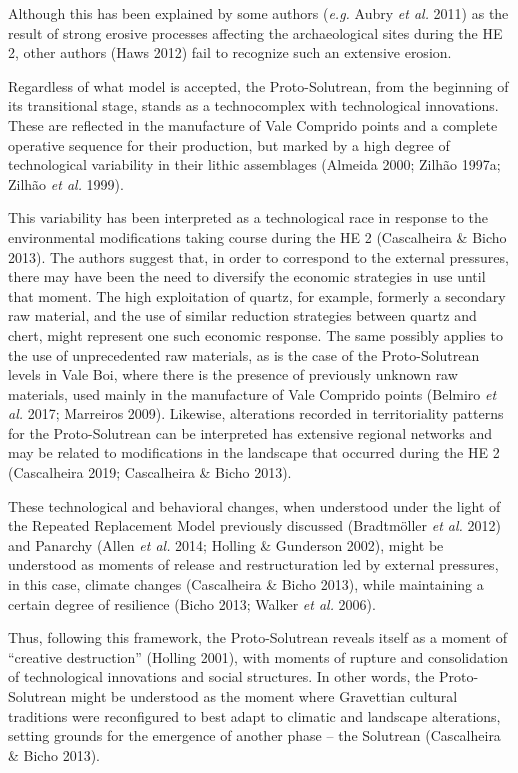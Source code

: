 \documentclass[12pt,twoside]{reedthesis}
\begin{document}
Although this has been explained by some authors (\emph{e.g.} Aubry \emph{et al.} 2011) as the result of strong erosive processes affecting the archaeological sites during the HE 2, other authors (Haws 2012) fail to recognize such an extensive erosion.

Regardless of what model is accepted, the Proto-Solutrean, from the beginning of its transitional stage, stands as a technocomplex with technological innovations. These are reflected in the manufacture of Vale Comprido points and a complete operative sequence for their production, but marked by a high degree of technological variability in their lithic assemblages (Almeida 2000; Zilhão 1997a; Zilhão \emph{et al.} 1999).

This variability has been interpreted as a technological race in response to the environmental modifications taking course during the HE 2 (Cascalheira \& Bicho 2013). The authors suggest that, in order to correspond to the external pressures, there may have been the need to diversify the economic strategies in use until that moment. The high exploitation of quartz, for example, formerly a secondary raw material, and the use of similar reduction strategies between quartz and chert, might represent one such economic response. The same possibly applies to the use of unprecedented raw materials, as is the case of the Proto-Solutrean levels in Vale Boi, where there is the presence of previously unknown raw materials, used mainly in the manufacture of Vale Comprido points (Belmiro \emph{et al.} 2017; Marreiros 2009). Likewise, alterations recorded in territoriality patterns for the Proto-Solutrean can be interpreted has extensive regional networks and may be related to modifications in the landscape that occurred during the HE 2 (Cascalheira 2019; Cascalheira \& Bicho 2013).

These technological and behavioral changes, when understood under the light of the Repeated Replacement Model previously discussed (Bradtmöller \emph{et al.} 2012) and Panarchy (Allen \emph{et al.} 2014; Holling \& Gunderson 2002), might be understood as moments of release and restructuration led by external pressures, in this case, climate changes (Cascalheira \& Bicho 2013), while maintaining a certain degree of resilience (Bicho 2013; Walker \emph{et al.} 2006).

Thus, following this framework, the Proto-Solutrean reveals itself as a moment of ``creative destruction'' (Holling 2001), with moments of rupture and consolidation of technological innovations and social structures. In other words, the Proto-Solutrean might be understood as the moment where Gravettian cultural traditions were reconfigured to best adapt to climatic and landscape alterations, setting grounds for the emergence of another phase -- the Solutrean (Cascalheira \& Bicho 2013).
\end{document}
